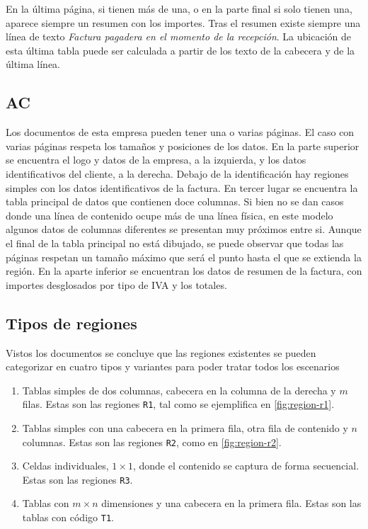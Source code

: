 En la última página, si tienen más de una, o en la parte final si solo tienen una, aparece siempre un resumen con los importes. Tras el resumen existe siempre una línea de texto \emph{Factura pagadera en el momento de la recepción}. La ubicación de esta última tabla puede ser calculada a partir de los texto de la cabecera y de la última línea.

\subsection{AC}

Los documentos de esta empresa pueden tener una o varias páginas. El caso con varias páginas respeta los tamaños y posiciones de los datos. En la parte superior se encuentra el logo y datos de la empresa, a la izquierda, y los datos identificativos del cliente, a la derecha. Debajo de la identificación hay regiones simples con los datos identificativos de la factura. En tercer lugar se encuentra la tabla principal de datos que contienen doce columnas. Si bien no se dan casos donde una línea de contenido ocupe más de una línea física, en este modelo algunos datos de columnas diferentes se presentan muy próximos entre si. Aunque el final de la tabla principal no está dibujado, se puede observar que todas las páginas respetan un tamaño máximo que será el punto hasta el que se extienda la región. En la aparte inferior se encuentran los datos de resumen de la factura, con importes desglosados por tipo de IVA y los totales.
 
\subsection{Tipos de regiones}

Vistos los documentos se concluye que las regiones existentes se pueden categorizar en cuatro tipos y variantes para poder tratar todos los escenarios

\begin{enumerate}
	\item Tablas simples de dos columnas, cabecera en la columna de la derecha y $m$ filas. Estas son las regiones \verb|R1|, tal como se ejemplifica en \ref{fig:region-r1}.
	\item Tablas simples con una cabecera en la primera fila, otra fila de contenido y $n$ columnas. Estas son las regiones \verb|R2|, como en \ref{fig:region-r2}.
	\item Celdas individuales, $1\times 1$, donde el contenido se captura de forma secuencial. Estas son las regiones \verb|R3|.
	\item Tablas con $m\times n$ dimensiones y una cabecera en la primera fila. Estas son las tablas con código \verb|T1|.
\end{enumerate}

